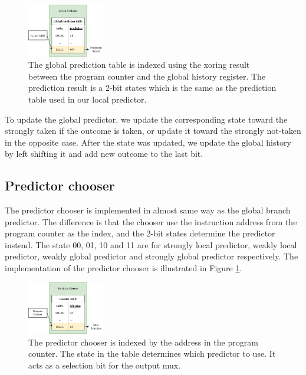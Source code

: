 \documentclass[conference]{IEEEtran}
\begin{document}
\begin{figure}[h]
    \centering
    \includegraphics[width=0.3\textwidth]{imgs/global_predictor}
    \caption{The global prediction table is indexed using the xoring result between the program counter and
    the global history register. The prediction result is a 2-bit states which is the same as the prediction
    table used in our local predictor.}
    \label{fig:global_predictor}
\end{figure}

To update the global predictor, we update the corresponding state toward the strongly taken if the outcome is taken,
or update it toward the strongly not-taken in the opposite case. After the state was updated,
we update the global history by left shifting it and add new outcome to the last bit.

\subsection{Predictor chooser}

The predictor chooser is implemented in almost same way as the global branch predictor. The difference is that the chooser
use the instruction address from the program counter as the index, and the 2-bit states determine the
predictor instead. The state 00, 01, 10 and 11 are for strongly local predictor, weakly local predictor,
weakly global predictor and strongly global predictor respectively. The implementation of the predictor chooser
is illustrated in Figure \ref{fig:global_predictor}.

\begin{figure}[h]
    \centering
    \includegraphics[width=0.3\textwidth]{imgs/predictor_chooser}
    \caption{The predictor chooser is indexed by the address in the program counter. The state in the table
    determines which predictor to use. It acts as a selection bit for the output mux.}
    \label{fig:predictor_chooser}
\end{figure}
\end{document}
